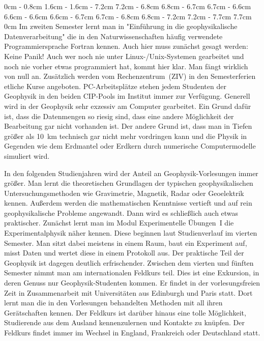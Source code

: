 \begin{multicols}{2}
0cm \columnwidth
0cm \columnwidth
0cm \columnwidth
0cm \columnwidth
0cm \columnwidth
0.8cm \dimexpr\columnwidth - 0.8cm
1.6cm \dimexpr\columnwidth - 1.6cm
\dimexpr\columnwidth - 7.2cm 7.2cm
\dimexpr\columnwidth - 6.8cm 6.8cm
\dimexpr\columnwidth - 6.7cm 6.7cm
\dimexpr\columnwidth - 6.6cm 6.6cm
\dimexpr\columnwidth - 6.6cm 6.6cm
\dimexpr\columnwidth - 6.7cm 6.7cm
\dimexpr\columnwidth - 6.8cm 6.8cm
\dimexpr\columnwidth - 7.2cm 7.2cm
\dimexpr\columnwidth - 7.7cm 7.7cm
0cm \columnwidth
Im zweiten Semester lernt man in "Einführung in die geophysikalische Datenverarbeitung" die in den Naturwissenschaften häufig verwendete Programmiersprache Fortran kennen. Auch hier muss zunächst gesagt werden: Keine Panik! Auch wer noch nie unter Linux-/Unix-Systemen gearbeitet und noch nie vorher etwas programmiert hat, kommt hier klar. Man fängt wirklich von null an. Zusätzlich werden vom Rechenzentrum~(ZIV) in den Semesterferien etliche Kurse angeboten. PC-Arbeitsplätze stehen jedem Studenten der Geophysik in den beiden CIP-Pools im Institut immer zur Verfügung. Generell wird in der Geophysik sehr exzessiv am Computer gearbeitet. Ein Grund dafür ist, dass die Datenmengen so riesig sind, dass eine andere Möglichkeit der Bearbeitung gar nicht vorhanden ist. Der andere Grund ist, dass man in Tiefen größer als \SI{10}{\km} technisch gar nicht mehr vordringen kann und die Physik in Gegenden wie dem Erdmantel oder Erdkern durch numerische Computermodelle simuliert wird.

In den folgenden Studienjahren wird der Anteil an Geophysik-Vorlesungen immer größer. Man lernt die theoretischen Grundlagen der typischen geophysikalischen Untersuchungsmethoden wie Gravimetrie, Magnetik, Radar oder Geoelektrik kennen. Außerdem werden die mathematischen Kenntnisse vertieft und auf rein geophysikalische Probleme angewandt. Dann wird es schließlich auch etwas praktischer. Zunächst lernt man im Modul Experimentelle Übungen~I die Experimentalphysik näher kennen. Diese beginnen laut Studienverlauf im vierten Semester. Man sitzt dabei meistens in einem Raum, baut ein Experiment auf, misst Daten und wertet diese in einem Protokoll aus. Der praktische Teil der Geophysik ist dagegen deutlich erfrischender. Zwischen dem vierten und fünften Semester nimmt man am internationalen Feldkurs teil. Dies ist eine Exkursion, in deren Genuss nur Geophysik-Studenten kommen. Er findet in der vorlesungsfreien Zeit in Zusammenarbeit mit Universitäten aus Edinburgh und Paris statt. Dort lernt man die in den Vorlesungen behandelten Methoden mit all ihren Gerätschaften kennen. Der Feldkurs ist darüber hinaus eine tolle Möglichkeit, Studierende aus dem Ausland kennenzulernen und Kontakte zu knüpfen. Der Feldkurs findet immer im Wechsel in England, Frankreich oder Deutschland statt.


\end{multicols}

